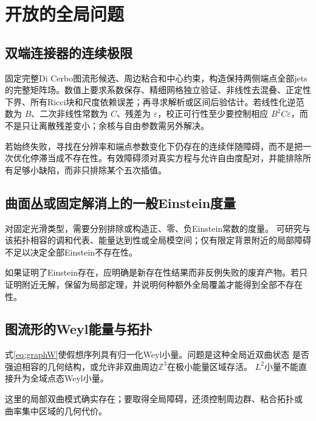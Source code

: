 \documentclass[UTF8,a4paper,11pt,fontset=fandol]{ctexart}
\numberwithin{equation}{section}
\theoremstyle{definition}
\newcommand{\Z}{\mathbb Z}
\begin{document}
\section{开放的全局问题}
\subsection{双端连接器的连续极限}
固定完整Di Cerbo图流形候选、周边粘合和中心约束，构造保持两侧端点全部jets的完整矩阵场。数值上要求系数保存、精细网格独立验证、非线性去混叠、正定性下界、所有Ricci块和尺度依赖误差；再寻求解析或区间后验估计。若线性化逆范数为 $B$、二次非线性常数为 $C$、残差为 $\varepsilon$，校正可行性至少要控制相应 $B^2C\varepsilon$，而不是只让离散残差变小；余核与自由参数需另外解决。

若始终失败，寻找在分辨率和端点参数变化下仍存在的连续伴随障碍，而不是把一次优化停滞当成不存在性。有效障碍须对真实方程与允许自由度配对，并能排除所有足够小缺陷，而非只排除某个五次插值。

\subsection{曲面丛或固定解消上的一般Einstein度量}
对固定光滑类型，需要分别排除或构造正、零、负Einstein常数的度量。
可研究与该拓扑相容的调和代表、能量达到性或全局模空间；仅有限定背景附近的局部障碍
不足以决定全部Einstein不存在性。

如果证明了Einstein存在，应明确是新存在性结果而非反例失败的废弃产物。若只证明附近无解，保留为局部定理，并说明何种额外全局覆盖才能得到全部不存在性。

\subsection{图流形的Weyl能量与拓扑}
式\eqref{eq:graphW}使假想序列具有归一化Weyl小量。问题是这种全局近双曲状态
是否强迫相容的几何结构，或允许非双曲周边$\Z^3$在极小能量区域存活。
$L^2$小量不能直接升为全域点态Weyl小量。

这里的局部双曲模式确实存在；要取得全局障碍，还须控制周边群、粘合拓扑或
曲率集中区域的几何代价。
\end{document}
